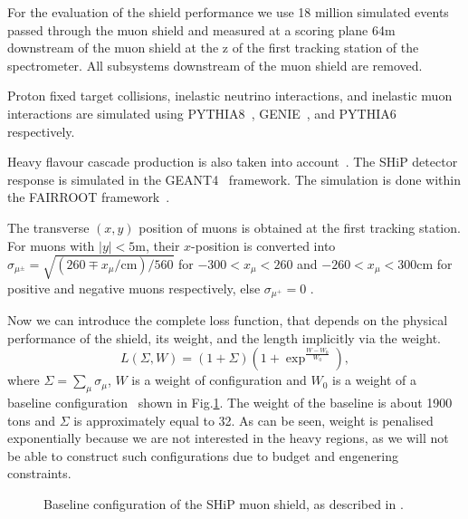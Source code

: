 \documentclass[a4paper]{jpconf}
\theoremstyle{my_theorem_style}
\numberwithin{equation}{section}
\begin{document}
For the evaluation of the shield performance we use 18 million
simulated events passed through the muon shield and measured at a
scoring plane 64m downstream of the muon shield at the z of the first
tracking station of the spectrometer. All subsystems downstream of the
muon shield are removed.

Proton fixed target collisions,  inelastic neutrino interactions, and  inelastic muon interactions
are simulated using PYTHIA8~\cite{Pythia8}, GENIE~\cite{Genie}, and
PYTHIA6~\cite{Pythia6} respectively. 

Heavy flavour cascade production is also taken into
account~\cite{Cascade}.  The SHiP detector response is simulated in
the GEANT4~\cite{Geant4} framework. 
The simulation is done within the FAIRROOT framework~\cite{FAIRROOT}. 

The transverse $(x,y)$ position of muons is obtained at the first
tracking station. For muons with $|y| < 5\mathrm{m}$, their
$x$-position is converted into $\sigma_{\mu^{\pm}}=  \sqrt{(260 \mp
  x_\mu /  \mathrm{cm})  / 560}$ for $-300< x_\mu < 260$ and $-260<x_\mu<300
\mathrm{cm}$ for positive and negative muons respectively, else
$\sigma_{\mu^+} = 0$ \cite{Akmete:2017bpl}.  



Now we can introduce the complete loss function, that depends on the
physical performance of the shield, its weight, and the length implicitly via the weight.
\[
L(\Sigma, W) = (1 + \Sigma) (1 + \exp^{\frac{W - W_{0}}{W_{0}}}),
\]
where $\Sigma  = \sum_{\mu} \sigma_{\mu}$, $W$ is a weight of
configuration and $W_{0}$ is a weight of a baseline
configuration~\cite{Akmete:2017bpl} shown in
Fig.\ref{fig:baseline}. The weight of the baseline is about 1900 tons
and $\Sigma$ is approximately equal to 32. As can be seen, weight is
penalised exponentially because we are not interested in the heavy
regions, as we will not be able to construct such configurations due
to budget and engenering constraints.


\begin{figure}[H]
\caption{\label{fig:baseline}Baseline configuration of the SHiP muon
  shield, as described in \cite{Akmete:2017bpl}.}
\end{figure}
\end{document}

